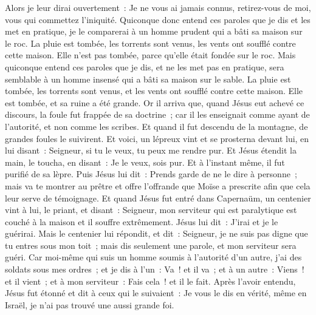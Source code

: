 \begin{multicols}{2}
Alors je leur dirai ouvertement~: Je ne vous ai jamais connus, retirez-vous de moi, vous qui commettez l'iniquité.
Quiconque donc entend ces paroles que je dis et les met en pratique, je le comparerai à un homme prudent qui a bâti sa maison sur le roc.
La pluie est tombée, les torrents sont venus, les vents ont soufflé contre cette maison. Elle n'est pas tombée, parce qu'elle était fondée sur le roc.
Mais quiconque entend ces paroles que je dis, et ne les met pas en pratique, sera semblable à un homme insensé qui a bâti sa maison sur le sable.
La pluie est tombée, les torrents sont venus, et les vents ont soufflé contre cette maison. Elle est tombée, et sa ruine a été grande.
Or il arriva que, quand Jésus eut achevé ce discours, la foule fut frappée de sa doctrine~;
car il les enseignait comme ayant de l'autorité, et non comme les scribes.
\VerseOne{}Et quand il fut descendu de la montagne, de grandes foules le suivirent.
Et voici, un lépreux vint et se prosterna devant lui, en lui disant~: Seigneur, si tu le veux, tu peux me rendre pur.
Et Jésus étendit la main, le toucha, en disant~: Je le veux, sois pur. Et à l'instant même, il fut purifié de sa lèpre.
Puis Jésus lui dit~: Prends garde de ne le dire à personne~; mais va te montrer au prêtre et offre l'offrande que Moïse a prescrite afin que cela leur serve de témoignage.
Et quand Jésus fut entré dans Capernaüm, un centenier vint à lui, le priant,
et disant~: Seigneur, mon serviteur qui est paralytique est couché à la maison et il souffre extrêmement.
Jésus lui dit~: J'irai et je le guérirai.
Mais le centenier lui répondit, et dit~: Seigneur, je ne suis pas digne que tu entres sous mon toit~; mais dis seulement une parole, et mon serviteur sera guéri.
Car moi-même qui suis un homme soumis à l'autorité d'un autre, j'ai des soldats sous mes ordres~; et je dis à l'un~: Va~! et il va~; et à un autre~: Viens~! et il vient~; et à mon serviteur~: Fais cela~! et il le fait.
Après l'avoir entendu, Jésus fut étonné et dit à ceux qui le suivaient~: Je vous le dis en vérité, même en Israël, je n'ai pas trouvé une aussi grande foi.

\end{multicols}

